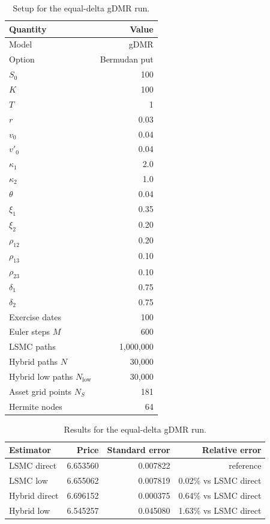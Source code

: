\documentclass[11pt]{article}
\begin{document}
\begin{table}[htbp]
\centering
\caption{Setup for the equal-delta gDMR run.}
\begin{tabular}{lr}
\toprule
Quantity & Value \\
\midrule
Model & gDMR \\
Option & Bermudan put \\
$S_0$ & 100 \\
$K$ & 100 \\
$T$ & 1 \\
$r$ & 0.03 \\
$v_0$ & 0.04 \\
$v'_0$ & 0.04 \\
$\kappa_1$ & 2.0 \\
$\kappa_2$ & 1.0 \\
$\theta$ & 0.04 \\
$\xi_1$ & 0.35 \\
$\xi_2$ & 0.20 \\
$\rho_{12}$ & 0.20 \\
$\rho_{13}$ & 0.10 \\
$\rho_{23}$ & 0.10 \\
$\delta_1$ & 0.75 \\
$\delta_2$ & 0.75 \\
Exercise dates & 100 \\
Euler steps $M$ & 600 \\
LSMC paths & 1,000,000 \\
Hybrid paths $N$ & 30,000 \\
Hybrid low paths $N_{\mathrm{low}}$ & 30,000 \\
Asset grid points $N_S$ & 181 \\
Hermite nodes & 64 \\
\bottomrule
\end{tabular}
\end{table}

\begin{table}[htbp]
\centering
\caption{Results for the equal-delta gDMR run.}
\begin{tabular}{lrrr}
\toprule
Estimator & Price & Standard error & Relative error \\
\midrule
LSMC direct   & 6.653560 & 0.007822 & reference \\
LSMC low      & 6.655062 & 0.007819 & 0.02\% vs LSMC direct \\
Hybrid direct & 6.696152 & 0.000375 & 0.64\% vs LSMC direct \\
Hybrid low    & 6.545257 & 0.045080 & 1.63\% vs LSMC direct \\
\bottomrule
\end{tabular}
\end{table}
\end{document}
